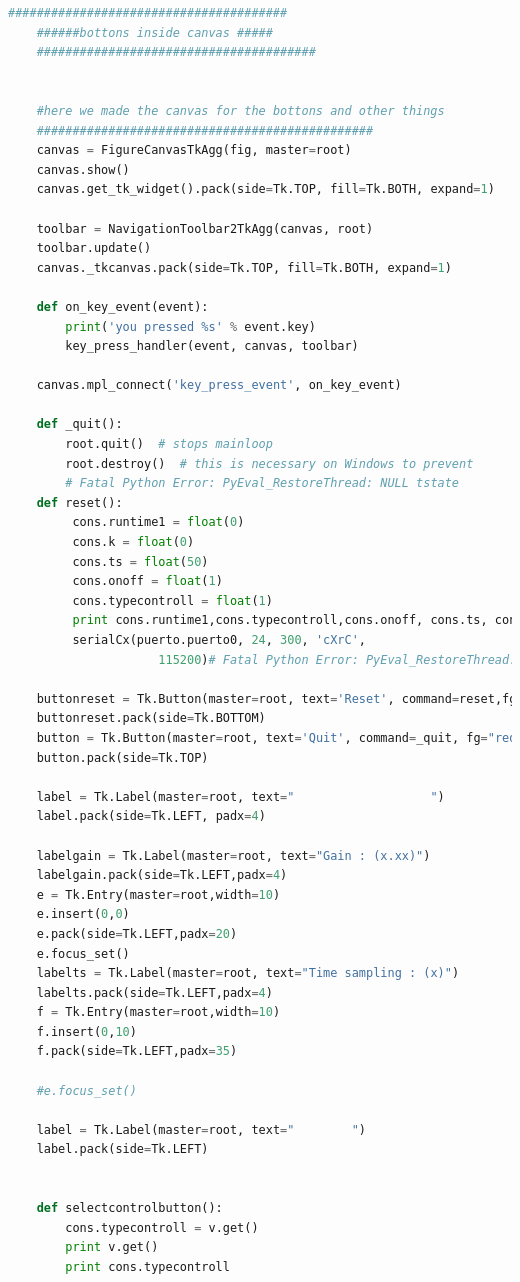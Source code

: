 {\begin{lstlisting}[language=python]
    #######################################
    ######bottons inside canvas #####
    #######################################


    #here we made the canvas for the bottons and other things
    ###############################################
    canvas = FigureCanvasTkAgg(fig, master=root)
    canvas.show()
    canvas.get_tk_widget().pack(side=Tk.TOP, fill=Tk.BOTH, expand=1)

    toolbar = NavigationToolbar2TkAgg(canvas, root)
    toolbar.update()
    canvas._tkcanvas.pack(side=Tk.TOP, fill=Tk.BOTH, expand=1)

    def on_key_event(event):
        print('you pressed %s' % event.key)
        key_press_handler(event, canvas, toolbar)

    canvas.mpl_connect('key_press_event', on_key_event)

    def _quit():
        root.quit()  # stops mainloop
        root.destroy()  # this is necessary on Windows to prevent
        # Fatal Python Error: PyEval_RestoreThread: NULL tstate
    def reset():
         cons.runtime1 = float(0)
         cons.k = float(0)
         cons.ts = float(50)
         cons.onoff = float(1)
         cons.typecontroll = float(1)
         print cons.runtime1,cons.typecontroll,cons.onoff, cons.ts, cons.k
         serialCx(puerto.puerto0, 24, 300, 'cXrC',
                     115200)# Fatal Python Error: PyEval_RestoreThread: NULL tstate

    buttonreset = Tk.Button(master=root, text='Reset', command=reset,fg="red",width=14)
    buttonreset.pack(side=Tk.BOTTOM)
    button = Tk.Button(master=root, text='Quit', command=_quit, fg="red", width=14)
    button.pack(side=Tk.TOP)

    label = Tk.Label(master=root, text="                   ")
    label.pack(side=Tk.LEFT, padx=4)

    labelgain = Tk.Label(master=root, text="Gain : (x.xx)")
    labelgain.pack(side=Tk.LEFT,padx=4)
    e = Tk.Entry(master=root,width=10)
    e.insert(0,0)
    e.pack(side=Tk.LEFT,padx=20)
    e.focus_set()
    labelts = Tk.Label(master=root, text="Time sampling : (x)")
    labelts.pack(side=Tk.LEFT,padx=4)
    f = Tk.Entry(master=root,width=10)
    f.insert(0,10)
    f.pack(side=Tk.LEFT,padx=35)

    #e.focus_set()

    label = Tk.Label(master=root, text="        ")
    label.pack(side=Tk.LEFT)


    def selectcontrolbutton():
        cons.typecontroll = v.get()
        print v.get()
        print cons.typecontroll


\end{lstlisting}}
